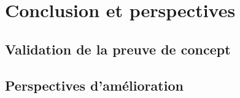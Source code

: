 \chapter*{Conclusion et perspectives}
\label{sec:conclusion}


\section*{Validation de la preuve de concept}
\label{sec:validation}


\section*{Perspectives d'amélioration}
\label{sec:perspectives}
